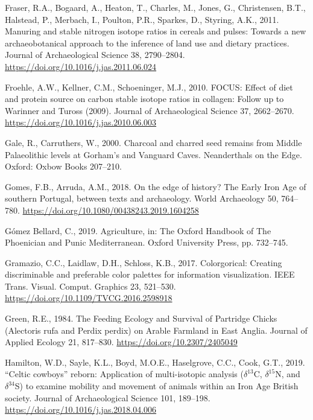 \documentclass[3p]{elsarticle} %
\newlength{\cslhangindent}
\newlength{\cslentryspacingunit} %
\newenvironment{CSLReferences}[2] %
 {%
  \setlength{\parindent}{0pt}
  \ifodd #1
  \let\oldpar\par
  \def\par{\hangindent=\cslhangindent\oldpar}
  \fi
  \setlength{\parskip}{#2\cslentryspacingunit}
 }%
 {}
\begin{document}
\begin{CSLReferences}{1}{0}
\leavevmode{}%
Fraser, R.A., Bogaard, A., Heaton, T., Charles, M., Jones, G., Christensen, B.T., Halstead, P., Merbach, I., Poulton, P.R., Sparkes, D., Styring, A.K., 2011. Manuring and stable nitrogen isotope ratios in cereals and pulses: Towards a new archaeobotanical approach to the inference of land use and dietary practices. Journal of Archaeological Science 38, 2790--2804. \url{https://doi.org/10.1016/j.jas.2011.06.024}

\leavevmode{}%
Froehle, A.W., Kellner, C.M., Schoeninger, M.J., 2010. {FOCUS}: Effect of diet and protein source on carbon stable isotope ratios in collagen: Follow up to {Warinner} and {Tuross} (2009). Journal of Archaeological Science 37, 2662--2670. \url{https://doi.org/10.1016/j.jas.2010.06.003}

\leavevmode{}%
Gale, R., Carruthers, W., 2000. Charcoal and charred seed remains from {Middle Palaeolithic} levels at {Gorham}'s and {Vanguard Caves}. Neanderthals on the Edge. Oxford: Oxbow Books 207--210.

\leavevmode{}%
Gomes, F.B., Arruda, A.M., 2018. On the edge of history? {The Early Iron Age} of southern {Portugal}, between texts and archaeology. World Archaeology 50, 764--780. \url{https://doi.org/10.1080/00438243.2019.1604258}

\leavevmode{}%
Gómez Bellard, C., 2019. Agriculture, in: The {Oxford Handbook} of {The Phoenician} and {Punic Mediterranean}. {Oxford University Press}, pp. 732--745.

\leavevmode{}%
Gramazio, C.C., Laidlaw, D.H., Schloss, K.B., 2017. Colorgorical: {Creating} discriminable and preferable color palettes for information visualization. IEEE Trans. Visual. Comput. Graphics 23, 521--530. \url{https://doi.org/10.1109/TVCG.2016.2598918}

\leavevmode{}%
Green, R.E., 1984. The {Feeding Ecology} and {Survival} of {Partridge Chicks} ({Alectoris} rufa and {Perdix} perdix) on {Arable Farmland} in {East Anglia}. Journal of Applied Ecology 21, 817--830. \url{https://doi.org/10.2307/2405049}

\leavevmode{}%
Hamilton, W.D., Sayle, K.L., Boyd, M.O.E., Haselgrove, C.C., Cook, G.T., 2019. {``{Celtic} cowboys''} reborn: Application of multi-isotopic analysis ({\(\delta^{13}\)C}, {\(\delta^{15}\)N}, and {\(\delta^{34}\)S}) to examine mobility and movement of animals within an {Iron Age British} society. Journal of Archaeological Science 101, 189--198. \url{https://doi.org/10.1016/j.jas.2018.04.006}


\end{CSLReferences}
\end{document}
